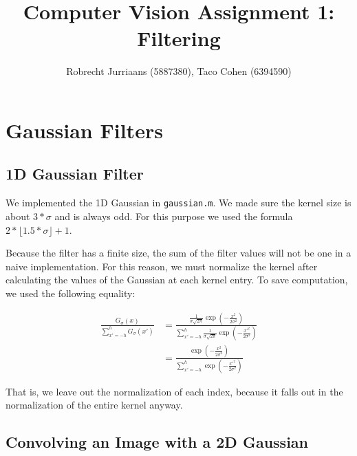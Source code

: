 \documentclass[a4paper,10pt]{article}
\title{Computer Vision Assignment 1: Filtering}
\author{Robrecht Jurriaans (5887380), Taco Cohen (6394590)}
\begin{document}
\maketitle

\section{Gaussian Filters}

\subsection{1D Gaussian Filter}
We implemented the 1D Gaussian in \verb+gaussian.m+.
We made sure the kernel size is about $3*\sigma$ and is always odd.
For this purpose we used the formula $2 * \lfloor 1.5 * \sigma \rfloor + 1$.

Because the filter has a finite size, the sum of the filter values will not be one in a naive implementation.
For this reason, we must normalize the kernel after calculating the values of the Gaussian at each kernel entry.
To save computation, we used the following equality:

\begin{align*}
 \frac{G_{\sigma}(x)}{\sum_{x'=-h}^h G_{\sigma}(x')} &= \frac{ \frac{1}{\sigma \sqrt{2 \pi}} \exp(-\frac{x^2}{2 \sigma^2})}
       {\sum_{x'=-h}^h \frac{1}{\sigma \sqrt{2 \pi}} \exp(-\frac{x'^2}{2 \sigma^2})} \\
&= \frac{ \exp(-\frac{x^2}{2 \sigma^2})}
       {\sum_{x'=-h}^h \exp(-\frac{x'^2}{2 \sigma^2})}
\end{align*}

That is, we leave out the normalization of each index, because it falls out in the normalization of the entire kernel anyway.

\subsection{Convolving an Image with a 2D Gaussian}
\end{document}
